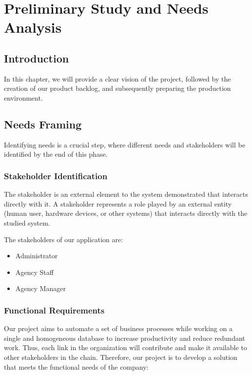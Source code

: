 

\chapter{ Preliminary Study and Needs Analysis}


\section*{Introduction}

In this chapter, we will provide a clear vision of the project, followed by the creation of our product backlog, and subsequently preparing the production environment.

\section{Needs Framing}

Identifying needs is a crucial step, where different needs and stakeholders will be identified by the end of this phase.

\subsection{Stakeholder Identification}

The stakeholder is an external element to the system demonstrated that interacts directly with it. A stakeholder represents a role played by an external entity (human user, hardware devices, or other systems) that interacts directly with the studied system.

The stakeholders of our application are:
\begin{itemize}
    \item Administrator
    \item Agency Staff
    \item Agency Manager
\end{itemize}

\subsection{Functional Requirements}

Our project aims to automate a set of business processes while working on a single and homogeneous database to increase productivity and reduce redundant work. Thus, each link in the organization will contribute and make it available to other stakeholders in the chain. Therefore, our project is to develop a solution that meets the functional needs of the company:


